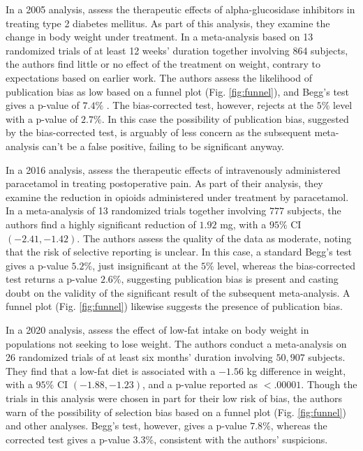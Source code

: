 \documentclass[12pt]{article}
\begin{document}
    In a 2005 analysis, \citet{van2005} assess the therapeutic effects
    of alpha-glucosidase inhibitors in treating type 2 diabetes
    mellitus. As part of this analysis, they examine the change in
    body weight under treatment. In a meta-analysis based on 13
    randomized trials of at least 12 weeks' duration together
    involving 864 subjects, the authors find little or no effect of
    the treatment on weight, contrary to expectations based on earlier
    work. The authors assess the likelihood of publication bias as low
    based on a funnel plot (Fig. \ref{fig:funnel}), and Begg's test
    gives a p-value of $7.4\%$ . The bias-corrected test, however,
    rejects at the $5\%$ level with a p-value of $2.7\%$. In this case
    the possibility of publication bias, suggested by the
    bias-corrected test, is arguably of less concern as the subsequent
    meta-analysis can't be a false positive, failing to be significant
    anyway.

    In a 2016 analysis, \citet{mcnicol2016} assess the therapeutic
    effects of intravenously administered paracetamol in treating
    postoperative pain. As part of their analysis, they examine the
    reduction in opioids administered under treatment by
    paracetamol. In a meta-analysis of 13 randomized trials together
    involving $777$ subjects, the authors find a highly significant
    reduction of $1.92$ mg, with a $95\%$ CI $(-2.41,-1.42)$. The
    authors assess the quality of the data as moderate, noting that
    the risk of selective reporting is unclear. In this case, a
    standard Begg's test gives a p-value $5.2\%$, just insignificant
    at the $5\%$ level, whereas the bias-corrected test returns a
    p-value $2.6\%$, suggesting publication bias is present and
    casting doubt on the validity of the significant result of the
    subsequent meta-analysis. A funnel plot (Fig. \ref{fig:funnel})
    likewise suggests the presence of publication bias.
    
    In a 2020 analysis, \citet{hooper2020} assess the effect of low-fat
    intake on body weight in populations not seeking to lose
    weight. The authors conduct a meta-analysis on 26 randomized
    trials of at least six months' duration involving $50,907$
    subjects. They find that a low-fat diet is associated with a
    $-1.56$ kg difference in weight, with a $95\%$ CI $(-1.88,-1.23)$,
    and a p-value reported as $<.00001$. Though the trials in this
    analysis were chosen in part for their low risk of bias,
    the authors warn of the possibility of selection bias based on a
    funnel plot (Fig. \ref{fig:funnel}) and other analyses. Begg's test, however, gives a
    p-value $7.8\%$, whereas the corrected test gives a p-value
    $3.3\%$, consistent with the authors' suspicions.
\end{document}
